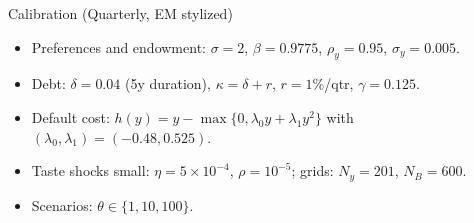 \documentclass[aspectratio=169,11pt,professionalfonts]{beamer}
\newcommand{\1}{\mathbb{1}}
\begin{document}
\begin{frame}{Calibration (Quarterly, EM stylized)}
  \begin{itemize}
    \item Preferences and endowment: $\sigma=2$, $\beta=0.9775$, $\rho_y=0.95$,
          $\sigma_y=0.005$.
    \item Debt: $\delta=0.04$ (5y duration), $\kappa=\delta{+}r$, $r=1\%$/qtr,
          $\gamma=0.125$.
    \item Default cost: $h(y)=y-\max\{0,\lambda_0 y+\lambda_1 y^2\}$ with
          $(\lambda_0,\lambda_1)=(-0.48,0.525)$.
    \item Taste shocks small: $\eta=5\times10^{-4}$, $\rho=10^{-5}$; grids: $N_y{=}201$,
          $N_B{=}600$.
    \item Scenarios: $\theta\in\{1,10,100\}$.
  \end{itemize}
\end{frame}
\end{document}

